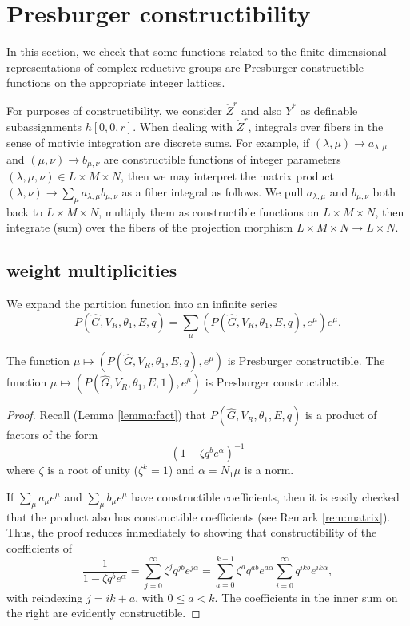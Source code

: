 \section{Presburger constructibility}

In this section, we check that some functions related to the finite
dimensional representations of complex reductive groups are Presburger
constructible functions on the appropriate integer lattices.  

\begin{remark}\label{rem:matrix}
  For purposes of constructibility, we consider $\ring{Z}^r$ and also
  $Y^*$ as definable subassignments $h[0,0,r]$. When dealing with
  $\ring{Z}^r$, integrals over fibers in the sense of motivic
  integration are discrete sums.  For example, if $(\lambda,\mu)\to
  a_{\lambda,\mu}$ and $(\mu,\nu)\to b_{\mu,\nu}$ are constructible
  functions of integer parameters $(\lambda,\mu,\nu)\in L\times
  M\times N$, then we may interpret the matrix product
  $(\lambda,\nu)\to \sum_{\mu} a_{\lambda,\mu} b_{\mu,\nu}$ as a fiber
  integral as follows.  We pull $a_{\lambda,\mu}$ and $b_{\mu,\nu}$
  both back to $L\times M\times N$, multiply them as constructible
  functions on $L\times M\times N$, then integrate (sum) over the
  fibers of the projection morphism $L\times M\times N\to L\times N$.
\end{remark}


\subsection{weight multiplicities}


We expand the partition function into an infinite series
\[
P(\hat G,V_R,\theta_1,E,q) = \sum_\mu (P(\hat G,V_R,\theta_1,E,q),e^\mu) e^{\mu}.
\]

\begin{lemma}\label{lemma:partition}
  The function $\mu\mapsto (P(\hat G,V_R,\theta_1,E,q),e^\mu)$ is Presburger
  constructible.  The function $\mu\mapsto (P(\hat G,V_R,\theta_1,E,1),e^\mu)$ is
  Presburger constructible.
\end{lemma}

\begin{proof} 
Recall (Lemma \ref{lemma:fact}) that $P(\hat G,V_R,\theta_1,E,q)$ is a product
of factors of the form
\[
(1- \zeta q^b e^\alpha)^{-1}
\]
where $\zeta$ is a root of unity ($\zeta^k=1$) and $\alpha = N_1\mu$ is a norm.

If $\sum_\mu a_\mu e^\mu$ and $\sum_\mu b_\mu e^\mu$ have
constructible coefficients, then it is easily checked that the product
also has constructible coefficients (see Remark \ref{rem:matrix}).  Thus, the proof reduces
immediately to showing that constructibility of the coefficients of
\[
\frac{1}{1-\zeta q^b e^\alpha} 
= \sum_{j=0}^\infty \zeta^j q^{j b} e^{j\alpha} = 
\sum_{a = 0}^{k-1} \zeta^a q^{a b} e^{a\alpha}\sum_{i=0}^\infty q^{i k b} e^{i k\alpha},
\]
with reindexing $j  = i k + a$, with $0\le a < k$.
The coefficients in the inner sum on the right are evidently constructible.
\end{proof}

